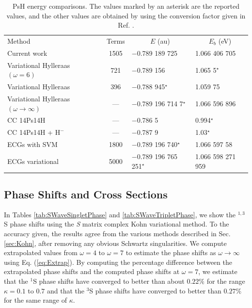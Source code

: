\documentclass[preprint,showpacs,preprintnumbers,amsmath,amssymb,longbibliography,pra,aps]{revtex4-1}
\newcommand*{\thead}[1]{\multicolumn{1}{c}{#1}}
\begin{document}
\squeezetable  %
\begin{table}
\begin{center}
\begin{ruledtabular}  %
\begin{tabular}{l c l l}
Method & Terms & \thead{$E$ (au)} & \thead{$E_b$ (eV)}\\
\colrule
Current work & 1505 & $-$0.789 189 725 & 1.066 406 705 \\
Variational Hylleraas $(\omega = 6)$ \cite{VanReeth2003} & 721 & $-$0.789 156 & 1.065 5$^\star$ \\
Variational Hylleraas \cite{Ho1986} & 396 & $-$0.788 945$^\star$ & 1.059 75 \\
Variational Hylleraas $(\omega \rightarrow \infty)$ \cite{Yan1999} & --- & $-$0.789 196 714 7$^\star$ & 1.066 596 896 \\
CC 14Ps14H \cite{Blackwood2002} & --- & $-$0.786 5 & 0.994$^\star$ \\
CC 14Ps14H + $\text{H}^-$ \cite{Walters2004} & --- & $-$0.787 9 & 1.03$^\star$\\
ECGs with SVM \cite{Mitroy2006} & 1800 & $-$0.789 196 740$^\star$ & 1.066 597 58 \\
ECGs variational \cite{Bubin2006} & 5000 & $-$0.789 196 765 251$^\star$ & 1.066 598 271 959 \\
\end{tabular}
\end{ruledtabular}
\caption{PsH energy comparisons. The values marked by an asterisk are the reported values, and the other values are obtained by using the conversion factor given in Ref. \cite{Mohr2012,*NISTConversions}.}
\label{tab:BoundEnergy}
\end{center}
\end{table}

\subsection{Phase Shifts and Cross Sections}

In Tables \ref{tab:SWaveSingletPhase} and \ref{tab:SWaveTripletPhase}, we show the $^{1,3}$S phase shifts using the \emph{S} matrix complex Kohn variational method. To the accuracy given, the results agree from the various methods described in Sec. \ref{sec:Kohn}, after removing any obvious Schwartz singularities. We compute extrapolated values from $\omega = 4$ to $\omega = 7$ to estimate the phase shifts as $\omega \rightarrow \infty$ using Eq. (\ref{eq:Extrap}). By computing the percentage difference between the extrapolated phase shifts and the computed phase shifts at $\omega=7$, we estimate that the $^1$S phase shifts have converged to better than about $0.22\%$ for the range $\kappa=0.1$ to $0.7$ and that the $^3$S phase shifts have converged to better than $0.27\%$ for the same range of $\kappa$.
\end{document}
